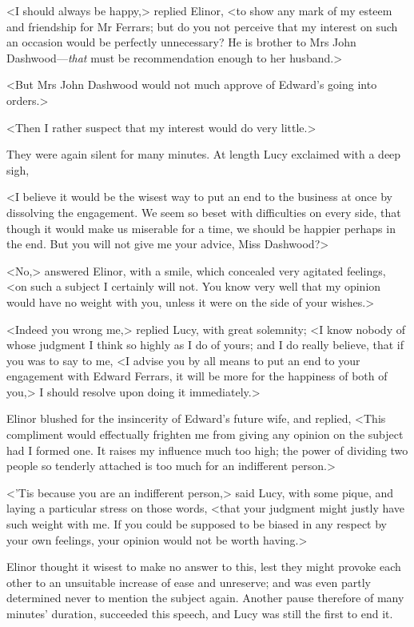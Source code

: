 <I should always be happy,> replied Elinor, <to show any mark of my esteem and friendship for Mr Ferrars; but do you not perceive that my interest on such an occasion would be perfectly unnecessary? He is brother to Mrs John Dashwood—\textit{that} must be recommendation enough to her husband.>

<But Mrs John Dashwood would not much approve of Edward's going into orders.>

<Then I rather suspect that my interest would do very little.>

They were again silent for many minutes. At length Lucy exclaimed with a deep sigh,

<I believe it would be the wisest way to put an end to the business at once by dissolving the engagement. We seem so beset with difficulties on every side, that though it would make us miserable for a time, we should be happier perhaps in the end. But you will not give me your advice, Miss Dashwood?>

<No,> answered Elinor, with a smile, which concealed very agitated feelings, <on such a subject I certainly will not. You know very well that my opinion would have no weight with you, unless it were on the side of your wishes.>

<Indeed you wrong me,> replied Lucy, with great solemnity; <I know nobody of whose judgment I think so highly as I do of yours; and I do really believe, that if you was to say to me, <I advise you by all means to put an end to your engagement with Edward Ferrars, it will be more for the happiness of both of you,> I should resolve upon doing it immediately.>

Elinor blushed for the insincerity of Edward's future wife, and replied, <This compliment would effectually frighten me from giving any opinion on the subject had I formed one. It raises my influence much too high; the power of dividing two people so tenderly attached is too much for an indifferent person.>

<'Tis because you are an indifferent person,> said Lucy, with some pique, and laying a particular stress on those words, <that your judgment might justly have such weight with me. If you could be supposed to be biased in any respect by your own feelings, your opinion would not be worth having.>

Elinor thought it wisest to make no answer to this, lest they might provoke each other to an unsuitable increase of ease and unreserve; and was even partly determined never to mention the subject again. Another pause therefore of many minutes' duration, succeeded this speech, and Lucy was still the first to end it.

